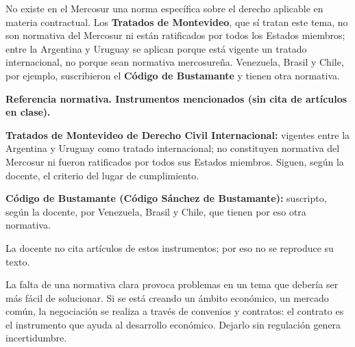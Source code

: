 \documentclass[12pt,oneside]{book}
\begin{document}
No existe en el Mercosur una norma específica sobre el derecho aplicable en materia contractual. Los \textbf{Tratados de Montevideo}, que sí tratan este tema, no son normativa del Mercosur ni están ratificados por todos los Estados miembros; entre la Argentina y Uruguay se aplican porque está vigente un tratado internacional, no porque sean normativa mercosureña. Venezuela, Brasil y Chile, por ejemplo, suscribieron el \textbf{Código de Bustamante} y tienen otra normativa.

\begin{note}
\textbf{Referencia normativa. Instrumentos mencionados (sin cita de artículos en clase).}

\textbf{Tratados de Montevideo de Derecho Civil Internacional:} vigentes entre la Argentina y Uruguay como tratado internacional; no constituyen normativa del Mercosur ni fueron ratificados por todos sus Estados miembros. Siguen, según la docente, el criterio del lugar de cumplimiento.

\textbf{Código de Bustamante (Código Sánchez de Bustamante):} suscripto, según la docente, por Venezuela, Brasil y Chile, que tienen por eso otra normativa.

La docente no cita artículos de estos instrumentos; por eso no se reproduce su texto.
\end{note}

La falta de una normativa clara provoca problemas en un tema que debería ser más fácil de solucionar. Si se está creando un ámbito económico, un mercado común, la negociación se realiza a través de convenios y contratos: el contrato es el instrumento que ayuda al desarrollo económico. Dejarlo sin regulación genera incertidumbre.
\end{document}
